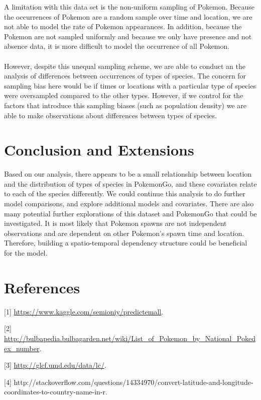 \documentclass{article}
\begin{document}
A limitation with this data set is the non-uniform sampling of Pokemon. Because the occurrences of Pokemon are a random sample over time and location, we are not able to model the rate of Pokemon appearances. In addition, because the Pokemon are not sampled uniformly and because we only have presence and not absence data, it is more difficult to model the occurrence of all Pokemon. \\ 
\\ 
However, despite this unequal sampling scheme, we are able to conduct an the analysis of differences between occurrences of types of species. The concern for sampling bias here would be if times or locations with a particular type of species were oversampled compared to the other types. However, if we control for the factors that introduce this sampling biases (such as population density) we are able to make observations about differences between types of species. 

\section{Conclusion and Extensions}

Based on our analysis, there appears to be a small relationship between location and the distribution of types of species in PokemonGo, and these covariates relate to each of the species differently. We could continue this analysis to do further model comparisons, and explore additional models and covariates. There are also many potential further explorations of this dataset and PokemonGo that could be investigated. It is most likely that Pokemon spawns are not independent observations and are dependent on other Pokemon's spawn time and location. Therefore, building a spatio-temporal dependency structure could be beneficial for the model. 

\newpage
\section{References}

\hypertarget{Ref1}{[1] \url{https://www.kaggle.com/semioniy/predictemall}.}

\noindent \hypertarget{Ref2}{[2] \url{http://bulbapedia.bulbagarden.net/wiki/List_of_Pokemon_by_National_Pokedex_number}.}

\noindent \hypertarget{Ref3}{[3] \url{http://glcf.umd.edu/data/lc/}.}

\noindent \hypertarget{Ref4}{[4] http://stackoverflow.com/questions/14334970/convert-latitude-and-longitude-coordinates-to-country-name-in-r}.
\end{document}
